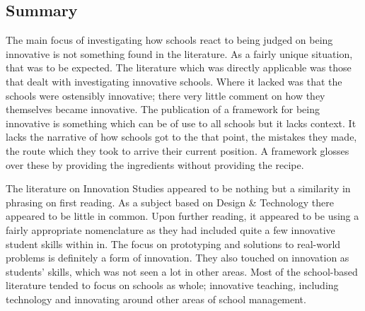 \subsection{Summary}
The main focus of investigating how schools react to being judged on being innovative is not something found in the literature. As a fairly unique situation, that was to be expected. The literature which was directly applicable was those that dealt with investigating innovative schools. Where it lacked was that the schools were ostensibly innovative; there very little comment on how they themselves became innovative. The publication of a framework for being innovative is something which can be of use to all schools but it lacks context. It lacks the narrative of how schools got to the that point, the mistakes they made, the route which they took to arrive their current position. A framework glosses over these by providing the ingredients without providing the recipe.

The literature on Innovation Studies appeared to be nothing but a similarity in phrasing on first reading. As a subject based on Design & Technology there appeared to be little in common. Upon further reading, it appeared to be using a fairly appropriate nomenclature as they had included quite a few innovative student skills within in. The focus on prototyping and solutions to real-world problems is definitely a form of innovation. They also touched on innovation as students' skills, which was not seen a lot in other areas. Most of the school-based literature tended to focus on schools as whole; innovative teaching, including technology and innovating around other areas of school management. 



\cite{StopI4:online}